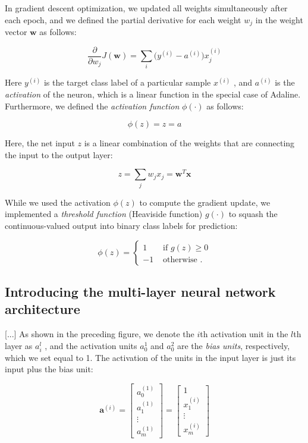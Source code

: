 \documentclass[letterpaper]{report}
\begin{document}
In gradient descent optimization, we updated all weights simultaneously after each epoch, and we defined the partial derivative for each weight $w_j$ in the weight vector
$\mathbf{w}$ as follows:

\[
\frac{\partial}{\partial w_j} J(\mathbf{w}) = \sum_i \big( y^{(i)} - a^{(i)} \big) x_{j}^{(i)}
\]

Here $y^{(i)}$ is the target class label of a particular sample $x^{(i)}$ , and $a^{(i)}$ is the \textit{activation} of the neuron, which is a linear function in the special case of Adaline. Furthermore, we defined the \textit{activation function} $\phi(\cdot)$ as follows:

\[
\phi(z) = z = a
\]

Here, the net input $z$  is a linear combination of the weights that are connecting the
input to the output layer:

\[
z = \sum_j w_j x_j = \mathbf{w}^T \mathbf{x}
\]

While we used the activation $\phi(z)$ to compute the gradient update, we implemented a \textit{threshold function} (Heaviside function) $g(\cdot)$ to squash the continuous-valued output into binary class labels for prediction:

\[ \phi(z) = \begin{cases} 
      1 & \text{ if } g(z) \ge 0 \\
      -1 & \text{ otherwise }.
   \end{cases}
\]

\subsection{Introducing the multi-layer neural network architecture}

[...] As shown in the preceding figure, we denote the $i$th activation unit in the $l$th layer as $a_{i}^{l}$ , and the activation units $a_{0}^{1}$ and $a_{0}^{2}$ are the \textit{bias units}, respectively, which we set equal to 1. The activation of the units in the input layer is just its input plus the bias unit:

\[
\mathbf{a}^{(i)} = 
\begin{bmatrix}
 a_{0}^{(1)} \\
 a_{1}^{(1)} \\
 \vdots \\
 a_{m}^{(1)}
\end{bmatrix}
= 
\begin{bmatrix}
 1 \\
 x_{1}^{(i)} \\
 \vdots \\
 x_{m}^{(i)}
\end{bmatrix}
\]
\end{document}
